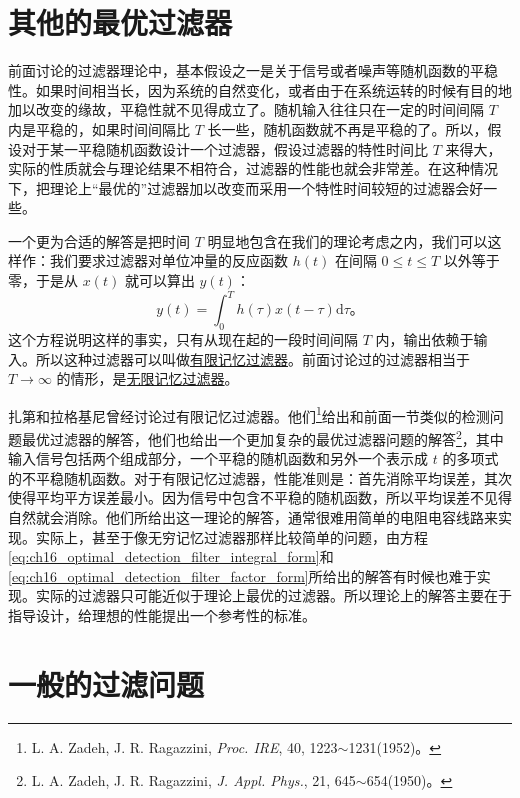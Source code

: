 \section{其他的最优过滤器}

前面讨论的过滤器理论中，基本假设之一是关于信号或者噪声等随机函数的平稳性。如果时间相当长，因为系统的自然变化，或者由于在系统运转的时候有目的地加以改变的缘故，平稳性就不见得成立了。随机输入往往只在一定的时间间隔 $T$ 内是平稳的，如果时间间隔比 $T$ 长一些，随机函数就不再是平稳的了。所以，假设对于某一平稳随机函数设计一个过滤器，假设过滤器的特性时间比 $T$ 来得大，实际的性质就会与理论结果不相符合，过滤器的性能也就会非常差。在这种情况下，把理论上“最优的”过滤器加以改变而采用一个特性时间较短的过滤器会好一些。

一个更为合适的解答是把时间 $T$ 明显地包含在我们的理论考虑之内，我们可以这样作：我们要求过滤器对单位冲量的反应函数 $h(t)$ 在间隔 $0\le t\le T$ 以外等于零，于是从 $x(t)$ 就可以算出 $y(t)$：
\begin{equation}
y(t) = \int_{0}^{T} h(\tau)x(t-\tau)\mathrm{d}\tau。
\label{eq:ch16_finite_memory_filter_output}
\end{equation}
这个方程说明这样的事实，只有从现在起的一段时间间隔 $T$ 内，输出依赖于输入。所以这种过滤器可以叫做\underline{有限记忆过滤器}。前面讨论过的过滤器相当于 $T\to\infty$ 的情形，是\underline{无限记忆过滤器}。

扎第和拉格基尼曾经讨论过有限记忆过滤器。他们\footnote{L. A. Zadeh, J. R. Ragazzini, \textit{Proc. IRE}, 40, 1223$\sim$1231(1952)。}给出和前面一节类似的检测问题最优过滤器的解答，他们也给出一个更加复杂的最优过滤器问题的解答\footnote{L. A. Zadeh, J. R. Ragazzini, \textit{J. Appl. Phys.}, 21, 645$\sim$654(1950)。}，其中输入信号包括两个组成部分，一个平稳的随机函数和另外一个表示成 $t$ 的多项式的不平稳随机函数。对于有限记忆过滤器，性能准则是：首先消除平均误差，其次使得平均平方误差最小。因为信号中包含不平稳的随机函数，所以平均误差不见得自然就会消除。他们所给出这一理论的解答，通常很难用简单的电阻电容线路来实现。实际上，甚至于像无穷记忆过滤器那样比较简单的问题，由方程\eqref{eq:ch16_optimal_detection_filter_integral_form}和\eqref{eq:ch16_optimal_detection_filter_factor_form}所给出的解答有时候也难于实现。实际的过滤器只可能近似于理论上最优的过滤器。所以理论上的解答主要在于指导设计，给理想的性能提出一个参考性的标准。


\section{一般的过滤问题}

